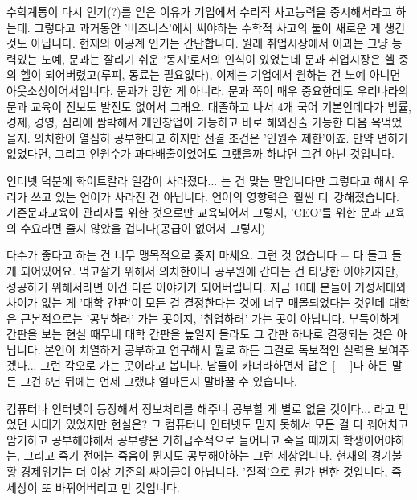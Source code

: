 수학계통이 다시 인기(?)를 얻은 이유가 기업에서 수리적 사고능력을 중시해서라고 하는데.
그렇다고 과거동안 '비즈니스'에서 써야하는 수학적 사고의 툴이 새로운 게 생긴 것도 아닙니다.
현재의 이공계 인기는 간단합니다.
원래 취업시장에서 이과는 그냥 능력있는 노예, 문과는 잘리기 쉬운 '동지'로서의 인식이 있었는데
문과 취업시장은 헬 중의 헬이 되어버렸고(루피, 동료는 필요없다), 이제는 기업에서 원하는 건 노예 아니면 아웃소싱이어서입니다.
문과가 망한 게 아니라, 문과 쪽이 매우 중요한데도 우리나라의 문과 교육이 진보도 발전도 없어서 그래요.
대졸하고 나서 4개 국어 기본인데다가 법률, 경제, 경영, 심리에 쌈박해서 개인창업이 가능하고 바로 해외진출 가능한 다음 욕먹었을지.
의치한이 열심히 공부한다고 하지만 선결 조건은 '인원수 제한'이죠.
만약 면허가 없었다면, 그리고 인원수가 과다배출이었어도 그랬을까 하냐면 그건 아닌 것입니다.
\vspace{5mm}

인터넷 덕분에 화이트칼라 일감이 사라졌다... 는 건 맞는 말입니다만
그렇다고 해서 우리가 쓰고 있는 언어가 사라진 건 아닙니다. 언어의 영향력은 훨씬 더 강해졌습니다.
기존문과교육이 관리자를 위한 것으로만 교육되어서 그렇지, 'CEO'를 위한 문과 교육의 수요라면 줄지 않았을 겁니다(공급이 없어서 그렇지)
\vspace{5mm}

다수가 좋다고 하는 건 너무 맹목적으로 좆지 마세요. 그런 것 없습니다 $-$ 다 돌고 돌게 되어있어요.
먹고살기 위해서 의치한이나 공무원에 간다는 건 타당한 이야기지만, 성공하기 위해서라면 이건 다른 이야기가 되어버립니다.
지금 10대 분들이 기성세대와 차이가 없는 게 '대학 간판'이 모든 걸 결정한다는 것에 너무 매몰되었다는 것인데
대학은 근본적으로는 '공부하러' 가는 곳이지, '취업하러' 가는 곳이 아닙니다.
부득이하게 간판을 보는 현실 때무네 대학 간판을 높일지 몰라도 그 간판 하나로 결정되는 것은 아닙니다.
본인이 치열하게 공부하고 연구해서 뭘로 하든 그걸로 독보적인 실력을 보여주겠다... 그런 각오로 가는 곳이라고 봅니다.
남들이 카더라하면서 답은 [   ]다 하든 말든 그건 5년 뒤에는 언제 그랬냐 얼마든지 말바꿀 수 있습니다.
\vspace{5mm}

컴퓨터나 인터넷이 등장해서 정보처리를 해주니 공부할 게 별로 없을 것이다... 라고 믿었던 시대가 있었지만 현실은?
그 컴퓨터나 인터넷도 믿지 못해서 모든 걸 다 꿰어차고 암기하고 공부해야해서 공부량은 기하급수적으로 늘어나고
죽을 때까지 학생이어야하는, 그리고 죽기 전에는 죽음이 뭔지도 공부해야하는 그런 세상입니다.
현재의 경기불황 경제위기는 더 이상 기존의 싸이클이 아닙니다.
'질적'으로 뭔가 변한 것입니다, 즉 세상이 또 바뀌어버리고 만 것입니다.
\vspace{5mm}

